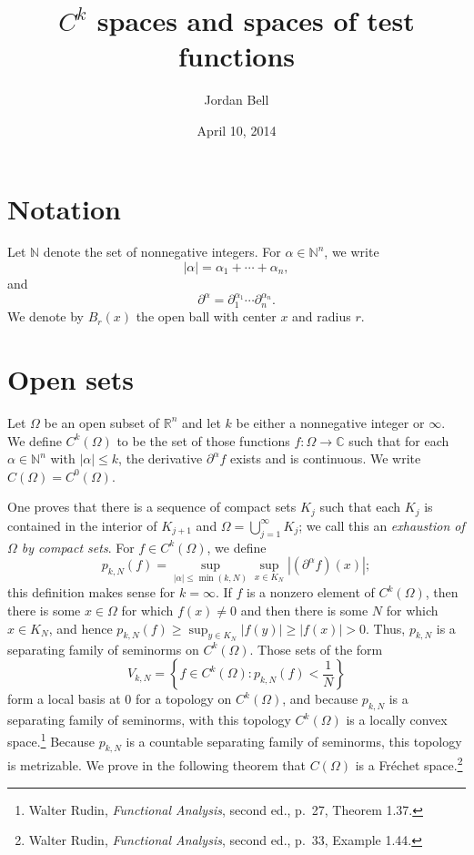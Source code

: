 \documentclass{article}
\begin{document}
\title{$C^k$ spaces and spaces of test functions}
\author{Jordan Bell}
\date{April 10, 2014}

\maketitle

\section{Notation}
Let $\mathbb{N}$ denote the set of nonnegative integers. For $\alpha \in \mathbb{N}^n$, we write
\[
|\alpha| = \alpha_1+\cdots+\alpha_n,
\]
and
\[
\partial^\alpha=\partial_1^{\alpha_1} \cdots \partial_n^{\alpha_n}.
\]
We denote by $B_r(x)$ the open ball with center $x$ and radius $r$.

\section{Open sets}
Let $\Omega$ be an open subset of $\mathbb{R}^n$ and let $k$ be either a nonnegative integer or $\infty$.
We define $C^k(\Omega)$ to be the set of those functions $f:\Omega \to \mathbb{C}$ such that for each $\alpha \in \mathbb{N}^n$ with $|\alpha| \leq k$, the derivative $\partial^\alpha f$ exists and is continuous. We write $C(\Omega)=C^0(\Omega)$.

One proves that there is a sequence of compact sets $K_j$
such that each $K_j$ is contained in the interior of $K_{j+1}$ and $\Omega=\bigcup_{j=1}^\infty K_j$;
 we call this an {\em exhaustion of $\Omega$ by compact sets}.
For $f \in C^k(\Omega)$, we define
\[
p_{k,N}(f)= \sup_{|\alpha| \leq \min(k,N)} \sup_{x \in K_N} |(\partial^\alpha f)(x)|;
\]
this definition makes sense for $k=\infty$.
 If $f$ is a nonzero element of $C^k(\Omega)$, then there is some $x \in \Omega$ for which $f(x) \neq 0$ and then
  there is some $N$ for which $x \in K_N$, and hence 
$p_{k,N}(f) \geq \sup_{y \in K_N} |f(y)| \geq |f(x)| > 0$.
Thus, $p_{k,N}$ is a separating family of seminorms on $C^k(\Omega)$.
Those sets of the form
\[
V_{k,N} = \left\{ f \in C^k(\Omega): p_{k,N}(f)<\frac{1}{N} \right\}
\]
form a local basis at $0$ for a topology on $C^k(\Omega)$, and because $p_{k,N}$ is a separating family of seminorms, with
this topology $C^k(\Omega)$ is a locally convex space.\footnote{Walter
Rudin, {\em Functional Analysis}, second ed., p.~27, Theorem 1.37.} Because $p_{k,N}$ is a countable separating family of
seminorms, this topology is metrizable.
We prove in the following theorem that 
$C(\Omega)$ is a Fr\'echet space.\footnote{Walter Rudin, {\em Functional Analysis}, second ed.,
p.~33, Example 1.44.} 
\end{document}
